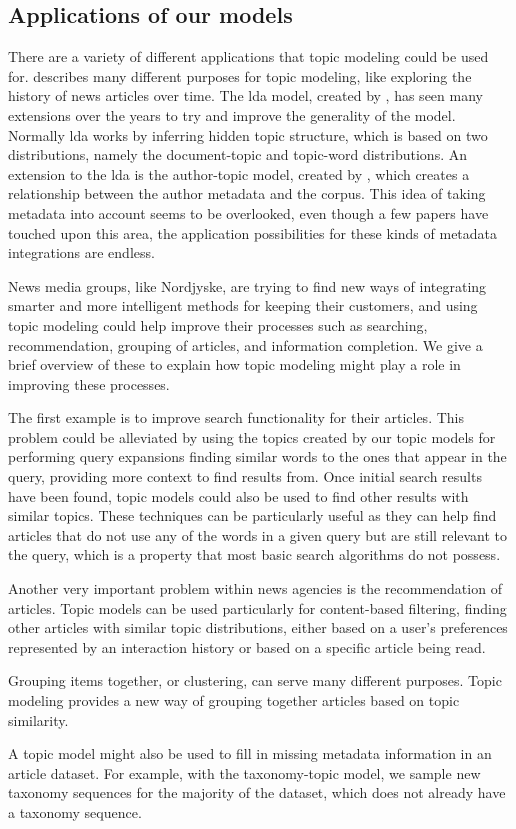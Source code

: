 \subsection{Applications of our models}\label{sec:appendix_applications}
There are a variety of different applications that topic modeling could be used for. 
\citet{Probabilistic_Topic_Models} describes many different purposes for topic modeling, like exploring the history of news articles over time.
The \gls{lda} model, created by \citet{blei2003latent}, has seen many extensions over the years to try and improve the generality of the model.
Normally \gls{lda} works by inferring hidden topic structure, which is based on two distributions, namely the document-topic and topic-word distributions.
An extension to the \gls{lda} is the author-topic model, created by \citet{author_topic_2012}, which creates a relationship between the author metadata and the corpus.
This idea of taking metadata into account seems to be overlooked, even though a few papers have touched upon this area, the application possibilities for these kinds of metadata integrations are endless.

News media groups, like Nordjyske, are trying to find new ways of integrating smarter and more intelligent methods for keeping their customers, and using topic modeling could help improve their processes such as searching, recommendation, grouping of articles, and information completion.
We give a brief overview of these to explain how topic modeling might play a role in improving these processes.

The first example is to improve search functionality for their articles.
This problem could be alleviated by using the topics created by our topic models for performing query expansions finding similar words to the ones that appear in the query, providing more context to find results from.
Once initial search results have been found, topic models could also be used to find other results with similar topics.
These techniques can be particularly useful as they can help find articles that do not use any of the words in a given query but are still relevant to the query, which is a property that most basic search algorithms do not possess.

Another very important problem within news agencies is the recommendation of articles.
Topic models can be used particularly for content-based filtering, finding other articles with similar topic distributions, either based on a user's preferences represented by an interaction history or based on a specific article being read.

Grouping items together, or clustering, can serve many different purposes. 
Topic modeling provides a new way of grouping together articles based on topic similarity.

A topic model might also be used to fill in missing metadata information in an article dataset.
For example, with the taxonomy-topic model, we sample new taxonomy sequences for the majority of the dataset, which does not already have a taxonomy sequence.
